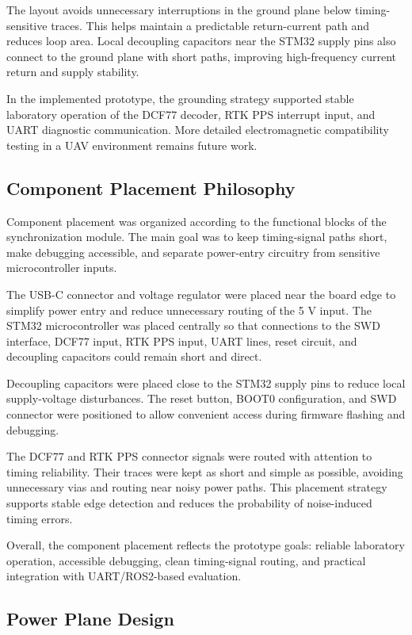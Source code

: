 The layout avoids unnecessary interruptions in the ground plane below timing-sensitive traces. This helps maintain a predictable return-current path and reduces loop area. Local decoupling capacitors near the STM32 supply pins also connect to the ground plane with short paths, improving high-frequency current return and supply stability.

In the implemented prototype, the grounding strategy supported stable laboratory operation of the DCF77 decoder, RTK PPS interrupt input, and UART diagnostic communication. More detailed electromagnetic compatibility testing in a UAV environment remains future work.

\subsection{Component Placement Philosophy}

Component placement was organized according to the functional blocks of the synchronization module. The main goal was to keep timing-signal paths short, make debugging accessible, and separate power-entry circuitry from sensitive microcontroller inputs.

The USB-C connector and voltage regulator were placed near the board edge to simplify power entry and reduce unnecessary routing of the 5 V input. The STM32 microcontroller was placed centrally so that connections to the SWD interface, DCF77 input, RTK PPS input, UART lines, reset circuit, and decoupling capacitors could remain short and direct.

Decoupling capacitors were placed close to the STM32 supply pins to reduce local supply-voltage disturbances. The reset button, BOOT0 configuration, and SWD connector were positioned to allow convenient access during firmware flashing and debugging.

The DCF77 and RTK PPS connector signals were routed with attention to timing reliability. Their traces were kept as short and simple as possible, avoiding unnecessary vias and routing near noisy power paths. This placement strategy supports stable edge detection and reduces the probability of noise-induced timing errors.

Overall, the component placement reflects the prototype goals: reliable laboratory operation, accessible debugging, clean timing-signal routing, and practical integration with UART/ROS2-based evaluation.

\subsection{Power Plane Design}

